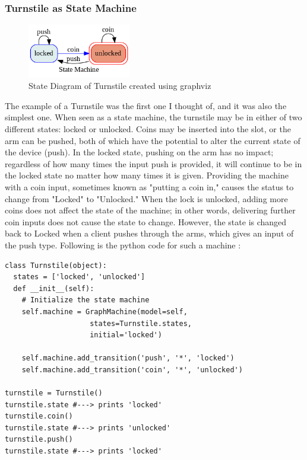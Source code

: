 \subsubsection{Turnstile as State Machine}
\begin{figure}[h!]
    \centering
    \includegraphics[width=0.4\textwidth,keepaspectratio]{images/FSM_turnstile.png}
    \caption*{State Diagram of Turnstile created using graphviz}
\end{figure}
\normalsize{
The example of a Turnstile was the first one I thought of, and it was also the simplest one. When seen as a state machine, the turnstile may be in either of two different states: locked or unlocked. Coins may be inserted into the slot, or the arm can be pushed, both of which have the potential to alter the current state of the device (push). In the locked state, pushing on the arm has no impact; regardless of how many times the input push is provided, it will continue to be in the locked state no matter how many times it is given. Providing the machine with a coin input, sometimes known as "putting a coin in," causes the status to change from "Locked" to "Unlocked." When the lock is unlocked, adding more coins does not affect the state of the machine; in other words, delivering further coin inputs does not cause the state to change. However, the state is changed back to Locked when a client pushes through the arms, which gives an input of the push type. Following is the python code for such a machine :}
\begin{verbatim}
class Turnstile(object):
  states = ['locked', 'unlocked']
  def __init__(self):
    # Initialize the state machine
    self.machine = GraphMachine(model=self, 
                    states=Turnstile.states, 
                    initial='locked')

    self.machine.add_transition('push', '*', 'locked')
    self.machine.add_transition('coin', '*', 'unlocked')
    
turnstile = Turnstile()
turnstile.state #---> prints 'locked'
turnstile.coin()
turnstile.state #---> prints 'unlocked'
turnstile.push()
turnstile.state #---> prints 'locked'
\end{verbatim}

